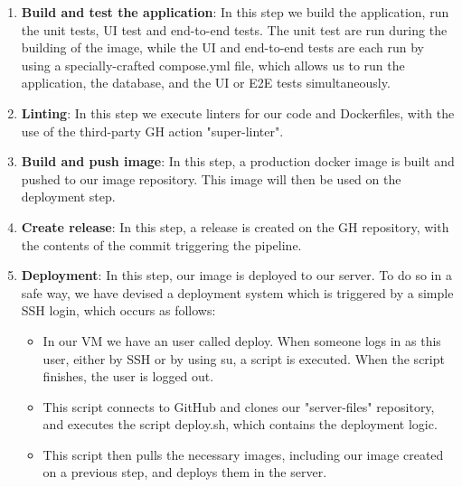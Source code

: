 \begin{enumerate}
	\item \textbf{Build and test the application}: In this step we build the application, run the unit tests, UI test and end-to-end tests. The unit test are run during the building of the image, while the UI and end-to-end tests are each run by using a specially-crafted compose.yml file, which allows us to run the application, the database, and the UI or E2E tests simultaneously. %
	\item \textbf{Linting}: In this step we execute linters for our code and Dockerfiles, with the use of the third-party GH action "super-linter". %
	\item \textbf{Build and push image}: In this step, a production docker image is built and pushed to our image repository. This image will then be used on the deployment step. %
	\item \textbf{Create release}: In this step, a release is created on the GH repository, with the contents of the commit triggering the pipeline. %
	\item \textbf{Deployment}: In this step, our image is deployed to our server. To do so in a safe way, we have devised a deployment system which is triggered by a simple SSH login, which occurs as follows:
	      \begin{itemize}
		      \item In our VM we have an user called deploy. When someone logs in as this user, either by SSH or by using su, a script is executed. %
		            When the script finishes, the user is logged out.
		      \item This script connects to GitHub and clones our "server-files" repository, and executes the script deploy.sh, which contains the deployment logic.
		      \item This script then pulls the necessary images, including our image created on a previous step, and deploys them in the server. %

\end{itemize}
\end{enumerate}
